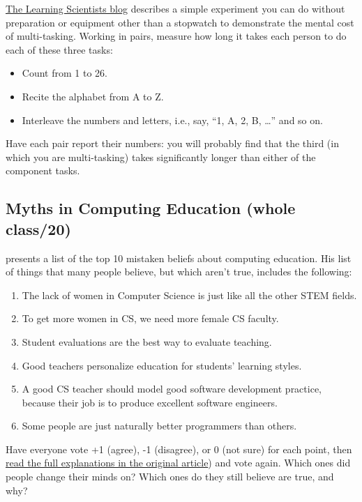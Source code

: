 \href{http://www.learningscientists.org/blog/2017/7/28-1}{The Learning Scientists blog}
describes a simple experiment you can do without preparation or
equipment other than a stopwatch to demonstrate the mental cost of
multi-tasking. Working in pairs, measure how long it takes each person
to do each of these three tasks:

\begin{itemize}
\item
  Count from 1 to 26.
\item
  Recite the alphabet from A to Z.
\item
  Interleave the numbers and letters, i.e., say, ``1, A, 2, B,
  \ldots{}'' and so on.
\end{itemize}

Have each pair report their numbers: you will probably find that the
third (in which you are multi-tasking) takes significantly longer than
either of the component tasks.

\subsection*{Myths in Computing Education (whole class/20)}

\cite{Guzd2015b} presents a list of the top 10 mistaken beliefs
about computing education. His list of things that many people
believe, but which aren't true, includes the following:

\begin{enumerate}
\item
  The lack of women in Computer Science is just like all the other
  STEM fields.
\item
  To get more women in CS, we need more female CS faculty.
\item
  Student evaluations are the best way to evaluate teaching.
\item
  Good teachers personalize education for students' learning styles.
\item
  A good CS teacher should model good software development practice,
  because their job is to produce excellent software engineers.
\item
  Some people are just naturally better programmers than others.
\end{enumerate}

Have everyone vote +1 (agree), -1 (disagree), or 0 (not sure) for each
point, then \href{https://cacm.acm.org/blogs/blog-cacm/189498-top-10-myths-about-teaching-computer-science/fulltext}{read the full explanations in the original
article}) and vote again. Which ones did people change
their minds on? Which ones do they still believe are true, and why?

